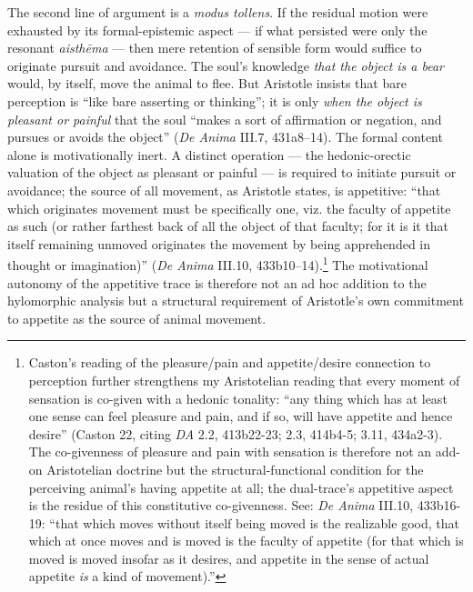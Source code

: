 \documentclass{article}
\begin{document}
The second line of argument is a \textit{modus tollens}. If the residual motion were exhausted by its formal-epistemic aspect --- if what persisted were only the resonant \textit{aisthēma} --- then mere retention of sensible form would suffice to originate pursuit and avoidance. The soul's knowledge \textit{that the object is a bear} would, by itself, move the animal to flee. But Aristotle insists that bare perception is ``like bare asserting or thinking''; it is only \textit{when the object is pleasant or painful} that the soul ``makes a sort of affirmation or negation, and pursues or avoids the object'' (\textit{De Anima} III.7, 431a8--14). The formal content alone is motivationally inert. A distinct operation --- the hedonic-orectic valuation of the object as pleasant or painful --- is required to initiate pursuit or avoidance; the source of all movement, as Aristotle states, is appetitive: ``that which originates movement must be specifically one, viz. the faculty of appetite as such (or rather farthest back of all the object of that faculty; for it is it that itself remaining unmoved originates the movement by being apprehended in thought or imagination)'' (\textit{De Anima} III.10, 433b10--14).\footnote{Caston's reading of the pleasure/pain and appetite/desire connection to perception further strengthens my Aristotelian reading that every moment of sensation is co-given with a hedonic tonality: ``any thing which has at least one sense can feel pleasure and pain, and if so, will have appetite and hence desire'' (Caston 22, citing \textit{DA} 2.2, 413b22-23; 2.3, 414b4-5; 3.11, 434a2-3). The co-givenness of pleasure and pain with sensation is therefore not an add-on Aristotelian doctrine but the structural-functional condition for the perceiving animal's having appetite at all; the dual-trace's appetitive aspect is the residue of this constitutive co-givenness. See: \textit{De Anima} III.10, 433b16-19: ``that which moves without itself being moved is the realizable good, that which at once moves and is moved is the faculty of appetite (for that which is moved is moved insofar as it desires, and appetite in the sense of actual appetite \textit{is} a kind of movement).''} The motivational autonomy of the appetitive trace is therefore not an ad hoc addition to the hylomorphic analysis but a structural requirement of Aristotle's own commitment to appetite as the source of animal movement.
\end{document}
